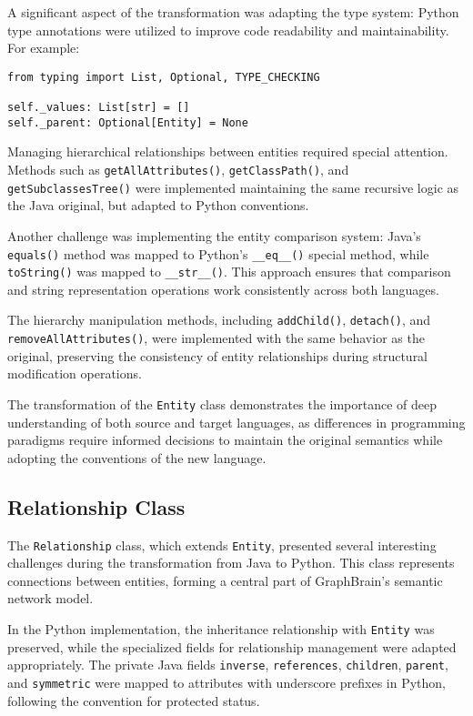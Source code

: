\documentclass[12pt,a4paper]{article}
\begin{document}
A significant aspect of the transformation was adapting the type system: Python type annotations were utilized to improve code readability and maintainability. For example:

\begin{verbatim}
from typing import List, Optional, TYPE_CHECKING

self._values: List[str] = []
self._parent: Optional[Entity] = None
\end{verbatim}

Managing hierarchical relationships between entities required special attention. Methods such as \texttt{getAllAttributes()}, \texttt{getClassPath()}, and \texttt{getSubclassesTree()} were implemented maintaining the same recursive logic as the Java original, but adapted to Python conventions.

Another challenge was implementing the entity comparison system: Java's \texttt{equals()} method was mapped to Python's \texttt{\_\_eq\_\_()} special method, while \texttt{toString()} was mapped to \texttt{\_\_str\_\_()}. This approach ensures that comparison and string representation operations work consistently across both languages.

The hierarchy manipulation methods, including \texttt{addChild()}, \texttt{detach()}, and \texttt{removeAllAttributes()}, were implemented with the same behavior as the original, preserving the consistency of entity relationships during structural modification operations.

The transformation of the \texttt{Entity} class demonstrates the importance of deep understanding of both source and target languages, as differences in programming paradigms require informed decisions to maintain the original semantics while adopting the conventions of the new language.

\subsection{Relationship Class}

The \texttt{Relationship} class, which extends \texttt{Entity}, presented several interesting challenges during the transformation from Java to Python. This class represents connections between entities, forming a central part of GraphBrain's semantic network model.

In the Python implementation, the inheritance relationship with \texttt{Entity} was preserved, while the specialized fields for relationship management were adapted appropriately. The private Java fields \texttt{inverse}, \texttt{references}, \texttt{children}, \texttt{parent}, and \texttt{symmetric} were mapped to attributes with underscore prefixes in Python, following the convention for protected status.
\end{document}
